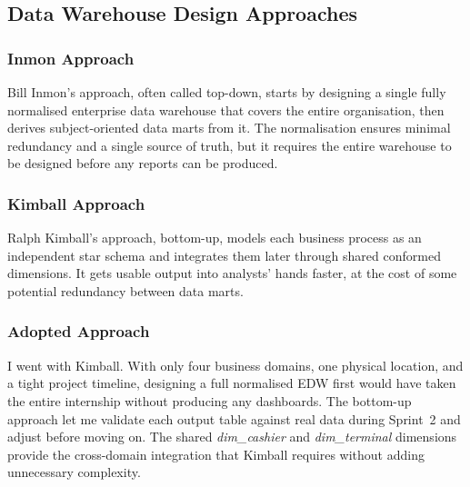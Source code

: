 \documentclass[12pt, a4paper]{report}
\begin{document}
\subsection{Data Warehouse Design Approaches}

\subsubsection{Inmon Approach}

Bill Inmon's approach, often called top-down, starts by designing a single fully
normalised enterprise data warehouse that covers the entire organisation, then
derives subject-oriented data marts from it. The normalisation ensures minimal
redundancy and a single source of truth, but it requires the entire warehouse to
be designed before any reports can be produced.


\subsubsection{Kimball Approach}

Ralph Kimball's approach, bottom-up, models each business process as an independent
star schema and integrates them later through shared conformed dimensions. It gets
usable output into analysts' hands faster, at the cost of some potential redundancy
between data marts.


\subsubsection{Adopted Approach}

I went with Kimball. With only four business domains, one physical location, and a
tight project timeline, designing a full normalised EDW first would have taken the
entire internship without producing any dashboards. The bottom-up approach let me
validate each output table against real data during Sprint~2 and adjust before
moving on. The shared \textit{dim\_cashier} and \textit{dim\_terminal} dimensions
provide the cross-domain integration that Kimball requires without adding unnecessary
complexity.
\end{document}
